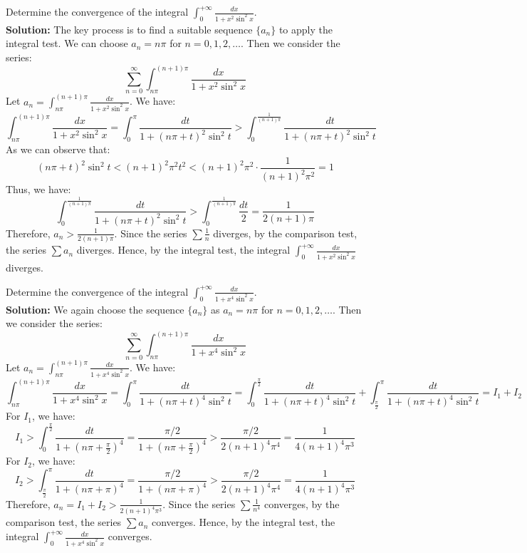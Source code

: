 \begin{example}
    Determine the convergence of the integral $\int_{0}^{+\infty} \frac{dx}{1 + x^2 \sin^2 x}$. \\
    \textbf{Solution:} The key process is to find a suitable sequence $\{a_n\}$ to apply the integral test. We can choose $a_n = n\pi$ for $n = 0, 1, 2, \ldots$. Then we consider the series:
    \[\sum_{n=0}^{\infty} \int_{n\pi}^{(n+1)\pi} \frac{dx}{1 + x^2 \sin^2 x}\]
    Let $a_n = \int_{n\pi}^{(n+1)\pi} \frac{dx}{1 + x^2 \sin^2 x}$. We have:
    \[
    \int_{n\pi}^{(n+1)\pi} \frac{dx}{1 + x^2 \sin^2 x} = \int_{0}^{\pi} \frac{dt}{1 + (n\pi + t)^2 \sin^2 t} > \int_{0}^{\frac{1}{(n+1)\pi}} \frac{dt}{1 + (n\pi + t)^2 \sin^2 t}
    \]
    As we can observe that:
    \[
    (n\pi + t)^2 \sin^2 t < (n+1)^2 \pi^2 t^2 < (n+1)^2 \pi^2 \cdot \frac{1}{(n+1)^2 \pi^2} = 1
    \]
    Thus, we have:
    \[\int_{0}^{\frac{1}{(n+1)\pi}} \frac{dt}{1 + (n\pi + t)^2 \sin^2 t} > \int_{0}^{\frac{1}{(n+1)\pi}} \frac{dt}{2} = \frac{1}{2(n+1)\pi}\]
    Therefore, $a_n > \frac{1}{2(n+1)\pi}$. Since the series $\sum \frac{1}{n}$ diverges, by the comparison test, the series $\sum a_n$ diverges. Hence, by the integral test, the integral $\int_{0}^{+\infty} \frac{dx}{1 + x^2 \sin^2 x}$ diverges.
\end{example}

\newpage

\begin{example}
    Determine the convergence of the integral $\int_{0}^{+\infty} \frac{dx}{1 + x^4 \sin^2 x}$. \\
    \textbf{Solution:} We again choose the sequence $\{a_n\}$ as $a_n = n\pi$ for $n = 0, 1, 2, \ldots$. Then we consider the series:
    \[\sum_{n=0}^{\infty} \int_{n\pi}^{(n+1)\pi} \frac{dx}{1 + x^4 \sin^2 x}\]
    Let $a_n = \int_{n\pi}^{(n+1)\pi} \frac{dx}{1 + x^4 \sin^2 x}$. We have:
    \[
    \int_{n\pi}^{(n+1)\pi} \frac{dx}{1 + x^4 \sin^2 x} = \int_{0}^{\pi} \frac{dt}{1 + (n\pi + t)^4 \sin^2 t}
    = \int_{0}^{\frac{\pi}{2}} \frac{dt}{1 + (n\pi + t)^4 \sin^2 t} + \int_{\frac{\pi}{2}}^{\pi} \frac{dt}{1 + (n\pi + t)^4 \sin^2 t} = I_1 + I_2
    \]
    For $I_1$, we have:
    \[I_1 > \int_{0}^{\frac{\pi}{2}} \frac{dt}{1 + (n\pi + \frac{\pi}{2})^4} = \frac{\pi/2}{1 + (n\pi + \frac{\pi}{2})^4} > \frac{\pi/2}{2(n+1)^4 \pi^4} = \frac{1}{4(n+1)^4 \pi^3}\]
    For $I_2$, we have:
    \[I_2 > \int_{\frac{\pi}{2}}^{\pi} \frac{dt}{1 + (n\pi + \pi)^4} = \frac{\pi/2}{1 + (n\pi + \pi)^4} > \frac{\pi/2}{2(n+1)^4 \pi^4} = \frac{1}{4(n+1)^4 \pi^3}\]
    Therefore, $a_n = I_1 + I_2 > \frac{1}{2(n+1)^4 \pi^3}$. Since the series $\sum \frac{1}{n^4}$ converges, by the comparison test, the series $\sum a_n$ converges. Hence, by the integral test, the integral $\int_{0}^{+\infty} \frac{dx}{1 + x^4 \sin^2 x}$ converges.
\end{example}

